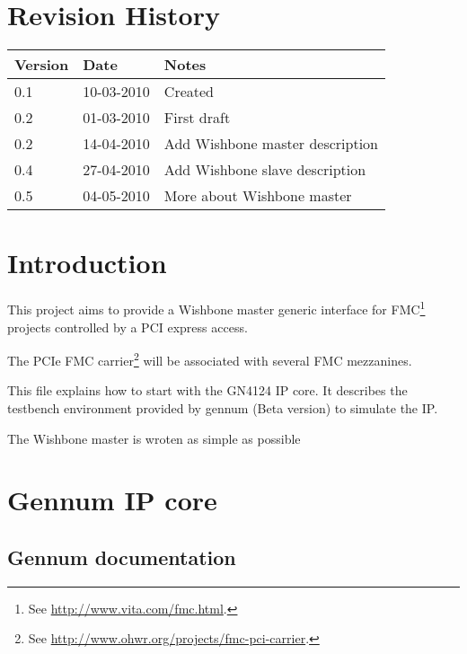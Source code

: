 \documentclass[10pt,a4paper]{cerndoc}
\begin{document}
\cerntitle
\section*{Revision History}
\begin{tabularx}{\textwidth}{|p{3cm}|p{3cm}|X|}
\hline \textbf{Version}&\textbf{Date}&\textbf{Notes}\\ \hline \hline
0.1 & 10-03-2010 & Created\\ \hline
0.2 & 01-03-2010 & First draft\\ \hline
0.2 & 14-04-2010 & Add Wishbone master description\\ \hline
0.4 & 27-04-2010 & Add Wishbone slave description\\ \hline
0.5 & 04-05-2010 & More about Wishbone master\\ \hline
\end{tabularx}

\tableofcontents
\listoffigures
\clearpage

\section*{Introduction}
This project aims to provide a Wishbone master generic interface for FMC\footnote{See \href{http://www.vita.com/fmc.html}{http://www.vita.com/fmc.html}.} projects controlled by a PCI express access.

The PCIe FMC carrier\footnote{See \href{http://www.ohwr.org/projects/fmc-pci-carrier}{http://www.ohwr.org/projects/fmc-pci-carrier}.} will be associated with several FMC mezzanines.

This file explains how to start with the GN4124 IP core. It describes the testbench environment provided by gennum (Beta version) to simulate the IP. 

The Wishbone master is wroten as simple as possible

\section{Gennum IP core}
\subsection{Gennum documentation}
\end{document}
